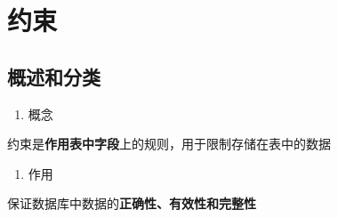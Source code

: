 \documentclass[
  letterpaper,
  DIV=11,
  numbers=noendperiod]{scrreprt}
\providecommand{\tightlist}{%
  \setlength{\itemsep}{0pt}\setlength{\parskip}{0pt}}\usepackage{longtable,booktabs,array}
\begin{document}
\hypertarget{ux7ea6ux675f}{%
\section{约束}\label{ux7ea6ux675f}}

\hypertarget{ux6982ux8ff0ux548cux5206ux7c7b}{%
\subsection{概述和分类}\label{ux6982ux8ff0ux548cux5206ux7c7b}}

\begin{enumerate}
\def\labelenumi{\arabic{enumi}.}
\tightlist
\item
  概念
\end{enumerate}

约束是\textbf{作用表中字段}上的规则，用于限制存储在表中的数据

\begin{enumerate}
\def\labelenumi{\arabic{enumi}.}
\setcounter{enumi}{1}
\tightlist
\item
  作用
\end{enumerate}

保证数据库中数据的\textbf{正确性、有效性和完整性}
\end{document}
